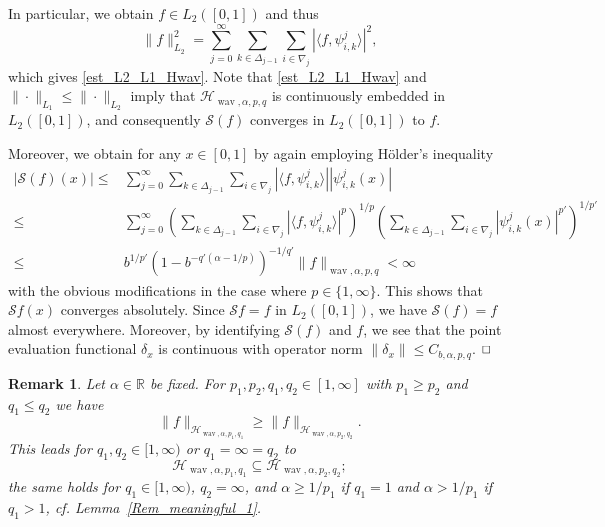\documentclass[12pt]{article}
\DeclareMathOperator{\wav}{wav}
\newtheorem{remark}{Remark}
\newenvironment{proof}{\begin{trivlist}
    \item[\hskip\labelsep{\it Proof.}]}{$\hfill\Box$\end{trivlist}}
\newcommand{\RR}{\mathbb{R}}
\newcommand{\HH}{\mathcal{H}}
\begin{document}
\begin{proof}[Proof of Lemma \ref{Rem_meaningful_1}]
In particular, we obtain $f\in L_2([0,1])$ and thus
$$
\|f\|^2_{L_2} = \sum^\infty_{j=0} \sum_{k\in \Delta_{j-1}} \sum_{i\in \nabla_{j}} | \langle f, \psi^{j}_{i,k} \rangle  |^{2},
$$
which gives \eqref{est_L2_L1_Hwav}. Note that \eqref{est_L2_L1_Hwav} and 
$\|\cdot \|_{L_1} \le \| \cdot \|_{L_2}$ imply that $\mathcal{H}_{\wav,\alpha,p,q}$ is continuously embedded in $L_2([0,1])$, and consequently $\mathcal{S}(f)$ converges in $L_2([0,1])$ to $f$. 

Moreover, we obtain for any $x\in [0,1]$ by again employing H\"older's inequality
\begin{equation*}
\begin{split}
|\mathcal{S}(f)(x)| 
\le &  \sum^\infty_{j=0} \sum_{k\in \Delta_{j-1}} \sum_{i\in \nabla_{j}} | \langle f, \psi^{j}_{i,k} \rangle |
| \psi^{j}_{i,k} (x) |\\
\le &\sum^\infty_{j=0} \left( \sum_{k\in \Delta_{j-1}} \sum_{i\in \nabla_{j}} | \langle f, \psi^{j}_{i,k} \rangle  |^{p} \right)^{1/p}    \left( \sum_{k\in \Delta_{j-1}} \sum_{i\in \nabla_{j}} | \psi^{j}_{i,k} (x)|^{p'} \right)^{1/p'} \\ 
\le &b^{1/p'} \left( 1- b^{-q'(\alpha -1/p)} \right)^{-1/q'} \|f\|_{\wav,\alpha,p,q}  <\infty
\end{split}
\end{equation*}
with the obvious modifications in the case where $p\in \{1,\infty\}$.
This shows that $\mathcal{S}f(x)$ converges absolutely. Since $\mathcal{S}f = f$ in $L_2([0,1])$, we have $\mathcal{S}(f) = f$ almost everywhere. Moreover, by identifying $\mathcal{S}(f)$ and $f$, we see that the point evaluation functional $\delta_x$ is continuous with operator norm $\|\delta_x\| \le C_{b,\alpha,p,q}$. 
\end{proof}

\begin{remark}\label{Rem:Haar_Inclusion}
Let $\alpha \in\RR$ be fixed. For  $p_1, p_2, q_1,q_2\in [1,\infty]$ with $p_1\ge p_2$ and $q_1\le q_2$ we have 
\begin{equation}\label{comparison_Haar_norms}
\|f\|_{\HH_{\wav,\alpha, p_1,q_1}} \ge  \|f\|_{\HH_{\wav,\alpha,p_2 ,q_2}}.
\end{equation}
This leads for  $q_1,q_2\in [1,\infty)$ or $q_1=\infty =q_2$ to
\begin{equation*}
\HH_{\wav,\alpha,p_1,q_1} \subseteq \HH_{\wav,\alpha,p_2,q_2};
\end{equation*}
the same holds for $q_1\in [1,\infty)$, $q_2=\infty$, and $\alpha \ge 1/p_1$ if $q_1=1$ and  $\alpha >1/p_1$ if $q_1>1$, cf. Lemma~\ref{Rem_meaningful_1}.
\end{remark}
\end{document}
